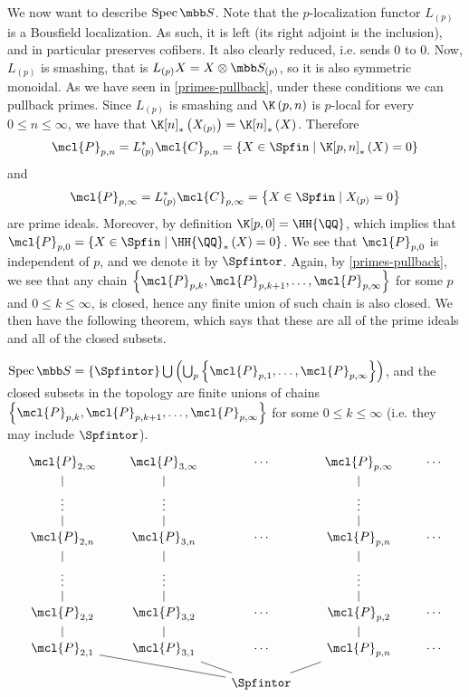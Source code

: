 We now want to describe $\spec \SS$.
Note that the $p$-localization functor $L_{\left(p\right)}$ is a Bousfield localization.
As such, it is left (its right adjoint is the inclusion), and in particular preserves cofibers.
It also clearly reduced, i.e. sends $0$ to $0$.
Now, $L_{\left(p\right)}$ is smashing, that is $L_{\left(p\right)} X = X \otimes \SS_{\left(p\right)}$, so it is also symmetric monoidal.
As we have seen in \ref{primes-pullback}, under these conditions we can pullback primes.
Since $L_{\left(p\right)}$ is smashing and $\K\left(p,n\right)$ is $p$-local for every $0 \leq n \leq \infty$, we have that $\K[n]_*\left(X_{\left(p\right)}\right) = \K[n]_*\left(X\right)$.
Therefore
$$
\mcl{P}_{p, n}
= L_{\left(p\right)}^* \mcl{C}_{p, n}
= \left\{
	X \in \Spfin
	\mid
	\K[p,n]_*\left(X\right) = 0
\right\}
$$
and
$$
\mcl{P}_{p, \infty}
= L_{\left(p\right)}^* \mcl{C}_{p, \infty}
= \left\{
	X \in \Spfin
	\mid
	X_{\left(p\right)} = 0
\right\}
$$
are prime ideals.
Moreover, by definition $\K[p,0] = \HH{\QQ}$, which implies that
$
\mcl{P}_{p, 0}
= \left\{
	X \in \Spfin
	\mid
	{\HH{\QQ}}_*\left(X\right) = 0
\right\}
$.
We see that $\mcl{P}_{p, 0}$ is independent of $p$, and we denote it by $\Spfintor$.
Again, by \ref{primes-pullback}, we see that any chain $\left\{ \mcl{P}_{p, k}, \mcl{P}_{p, k+1}, \dotsc, \mcl{P}_{p, \infty} \right\}$ for some $p$ and $0 \leq k \leq \infty$, is closed, hence any finite union of such chain is also closed.
We then have the following theorem, which says that these are all of the prime ideals and all of the closed subsets.

\begin{theorem}
	$
	\spec \SS
	= \left\{\Spfintor\right\}
	\bigcup \left(\bigcup_p \left\{\mcl{P}_{p, 1}, \dotsc, \mcl{P}_{p, \infty}\right\}\right)
	$,
	and the closed subsets in the topology are finite unions of chains
	$\left\{ \mcl{P}_{p, k}, \mcl{P}_{p, k+1}, \dotsc, \mcl{P}_{p, \infty} \right\}$
	for some $0 \leq k \leq \infty$ (i.e. they may include $\Spfintor$).
	$$
	\begin{tikzcd}[row sep=small, column sep=scriptsize]	
		\mcl{P}_{2, \infty} & \mcl{P}_{3, \infty} & \cdots & \mcl{P}_{p, \infty} & \cdots\\
		\vdots \arrow[dash]{u}{} & \vdots \arrow[dash]{u}{} &  & \vdots \arrow[dash]{u}{} & \\
		\mcl{P}_{2, n} \arrow[dash]{u}{} & \mcl{P}_{3, n} \arrow[dash]{u}{} & \cdots & \mcl{P}_{p, n} \arrow[dash]{u}{} & \cdots\\
		\vdots \arrow[dash]{u}{} & \vdots \arrow[dash]{u}{} &  & \vdots \arrow[dash]{u}{} & \\
		\mcl{P}_{2, 2} \arrow[dash]{u}{} & \mcl{P}_{3, 2} \arrow[dash]{u}{} & \cdots & \mcl{P}_{p, 2} \arrow[dash]{u}{} & \cdots\\
		\mcl{P}_{2, 1} \arrow[dash]{u}{} & \mcl{P}_{3, 1} \arrow[dash]{u}{} & \cdots & \mcl{P}_{p, n} \arrow[dash]{u}{} & \cdots\\
		& & \Spfintor \arrow[dash]{ull}{} \arrow[dash]{ul}{} \arrow[dash]{ur}{}
	\end{tikzcd}
	$$
\end{theorem}

